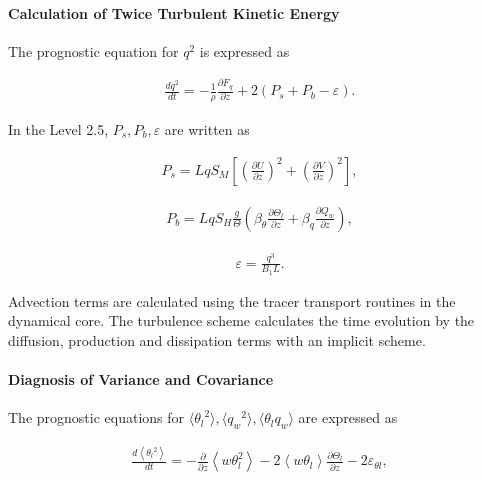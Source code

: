 \hypertarget{calculation-of-twice-turbulent-kinetic-energy}{%
\paragraph{Calculation of Twice Turbulent Kinetic
Energy}\label{calculation-of-twice-turbulent-kinetic-energy}}

The prognostic equation for \(q^2\) is expressed as

\begin{eqnarray} \frac{d q^2}{dt}=-\frac{1}{\rho}\frac{\partial F_q}{\partial z}+2\left(P_s+P_b-\varepsilon\right). \end{eqnarray}

In the Level 2.5, \(P_s,P_b,\varepsilon\) are written as

\begin{eqnarray}P_s=Lq S_M \left[\left(\frac{\partial U}{\partial z}\right)^2+\left(\frac{\partial V}{\partial z}\right)^2\right],\end{eqnarray}

\begin{eqnarray}P_b=Lq S_H \frac{g}{\Theta}\left(\beta_\theta \frac{\partial \Theta_l}{\partial z}+\beta_q \frac{\partial Q_w}{\partial z}\right),\end{eqnarray}

\begin{eqnarray}\varepsilon=\frac{q^3}{B_1L}.\end{eqnarray}

Advection terms are calculated using the tracer transport routines in
the dynamical core. The turbulence scheme calculates the time evolution
by the diffusion, production and dissipation terms with an implicit
scheme.

\hypertarget{diagnosis-of-variance-and-covariance}{%
\paragraph{Diagnosis of Variance and
Covariance}\label{diagnosis-of-variance-and-covariance}}

The prognostic equations for
\(\langle {\theta_l}^2 \rangle,\langle {q_w}^2 \rangle,\langle \theta_l q_w \rangle\)
are expressed as

\begin{eqnarray}
\frac{d\left\langle{\theta_l}^{2}\right\rangle}{d t}=-\frac{\partial}{\partial z}\left\langle w \theta_{l}^{2}\right\rangle-2\left\langle w \theta_{l}\right\rangle \frac{\partial \Theta_{l}}{\partial z}-2 \varepsilon_{\theta l},
\end{eqnarray}

